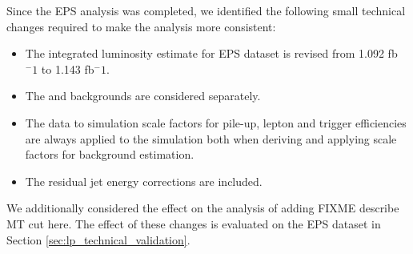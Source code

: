 
Since the EPS analysis was completed, we identified the following small technical
changes required to make the analysis more consistent:

\begin{itemize}
    \item The integrated luminosity estimate for EPS dataset is revised from 1.092 fb$^-1$ to 1.143 fb$^-1$.
    \item The \dytt and \dyll backgrounds are considered separately.
    \item The data to simulation scale factors for pile-up, lepton and trigger efficiencies are 
always applied to the simulation both when deriving and applying scale factors for background estimation.
    \item The residual jet energy corrections are included.
\end{itemize}

We additionally considered the effect on the analysis of adding FIXME describe MT cut here.
The effect of these changes is evaluated on the EPS dataset in Section \ref{sec:lp_technical_validation}.

